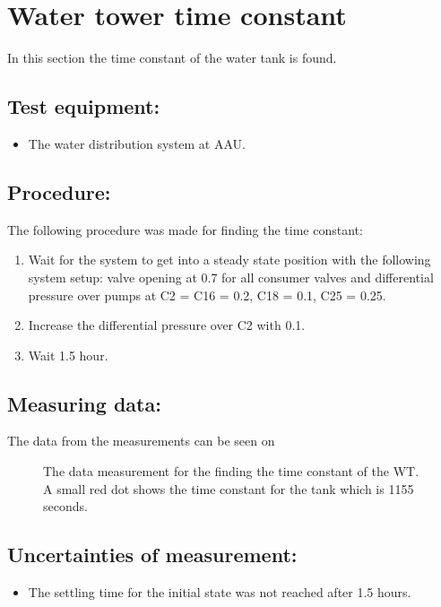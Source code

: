 \section{Water tower time constant}
\label{sec:WT_TimeConstant}

In this section the time constant of the water tank is found.

\subsection*{Test equipment:}
\begin{itemize}
\item The water distribution system at AAU.
\end{itemize}

\subsection*{Procedure:}
The following procedure was made for finding the time constant:
\begin{enumerate}
\item Wait for the system to get into a steady state position with the following system setup: valve opening at 0.7 for all consumer valves and differential pressure over pumps at C2 = C16 = 0.2, C18 = 0.1, C25 = 0.25.
\item Increase the differential pressure over C2 with 0.1.
\item Wait 1.5 hour.
\end{enumerate}


\subsection*{Measuring data:}
The data from the measurements can be seen on 

\begin{figure}[H]

\caption{The data measurement for the finding the time constant of the WT. A small red dot shows the time constant for the tank which is 1155 seconds.}
\label{fig:Test_WT_Timeconstant}
\end{figure}

\subsection*{Uncertainties of measurement:}
\begin{itemize}
\item The settling time for the initial state was not reached after 1.5 hours.
\end{itemize}

